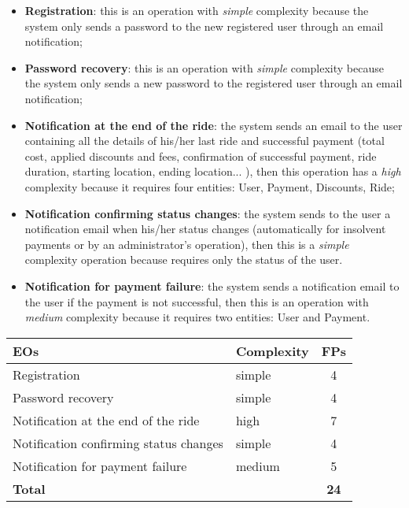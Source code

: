 \begin{itemize}
	\item \textbf{Registration}: this is an operation with \textit{simple} complexity because the system only sends a password to the new registered user through an email notification;
	\item \textbf{Password recovery}: this is an operation with \textit{simple} complexity because the system only sends a new password to the registered user through an email notification;
	\item \textbf{Notification at the end of the ride}: the system sends an email to the user containing all the details of his/her last ride and successful payment (total cost, applied discounts and fees, confirmation of successful payment, ride duration, starting location, ending location... ), then this operation has a \textit{high} complexity because it requires four entities: User, Payment, Discounts, Ride;
	\item \textbf{Notification confirming status changes}: the system sends to the user a notification email when his/her status changes (automatically for insolvent payments or by an administrator's operation), then this is a \textit{simple} complexity operation because requires only the status of the user. 
	\item \textbf{Notification for payment failure}: the system sends a notification email to the user if the payment is not successful, then this is an operation with \textit{medium} complexity because it requires two entities: User and Payment.
\end{itemize}

\begin{center}
	\begin{tabular}{|l|l|c|}
		\hline
		\textbf{EOs} 	& \textbf{Complexity} 	& \textbf{FPs} \\
		\hline
		Registration 	& simple 	& 4 \\
		Password recovery 	& simple 	& 4 \\
		Notification at the end of the ride 	& high 	& 7 \\
		Notification confirming status changes 	& simple 	& 4 \\
		Notification for payment failure 	& medium 	& 5 \\
		\hline \hline
		\textbf{Total} 	& 	& \textbf{24} \\
		\hline
	\end{tabular}
\end{center}

